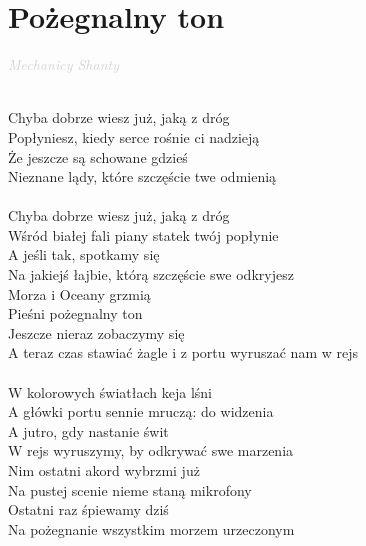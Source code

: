 \documentclass[a5paper, 10pt]{book}
\begin{document}
\section{Pożegnalny ton}\textcolor{lightgray}{\textit{Mechanicy Shanty}}\\~\\
\begin{minipage}[t]{0.75\textwidth}
  Chyba dobrze wiesz już, jaką z dróg\\
  Popłyniesz, kiedy serce rośnie ci nadzieją\\
  Że jeszcze są schowane gdzieś\\
  Nieznane lądy, które szczęście twe odmienią\\
  \\
  Chyba dobrze wiesz już, jaką z dróg\\
  Wśród białej fali piany statek twój popłynie\\
  A jeśli tak, spotkamy się\\
  Na jakiejś łajbie, którą szczęście swe odkryjesz\\

  \hspace*{5mm}Morza i Oceany grzmią\\
  \hspace*{5mm}Pieśni pożegnalny ton\\
  \hspace*{5mm}Jeszcze nieraz zobaczymy się\\
  \hspace*{5mm}A teraz czas stawiać żagle i z portu wyruszać nam w rejs\\
  \\
  W kolorowych światłach keja lśni\\
  A główki portu sennie mruczą: do widzenia\\
  A jutro, gdy nastanie świt\\
  W rejs wyruszymy, by odkrywać swe marzenia\\

  Nim ostatni akord wybrzmi już\\
  Na pustej scenie nieme staną mikrofony\\
  Ostatni raz śpiewamy dziś\\
  Na pożegnanie wszystkim morzem urzeczonym\\
\end{minipage}
\end{document}
